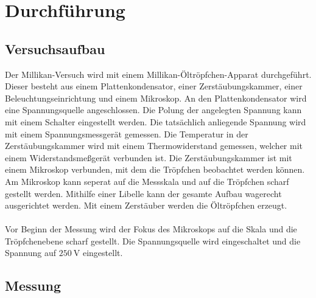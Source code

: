 \section{Durchführung}
\label{sec:Durchführung}

\subsection{Versuchsaufbau}
\label{sec:Versuchsaufbau}


Der Millikan-Versuch wird mit einem Millikan-Öltröpfchen-Apparat durchgeführt.
Dieser besteht aus einem Plattenkondensator, einer Zerstäubungskammer, einer Beleuchtungseinrichtung und einem Mikroskop.
An den Plattenkondensator wird eine Spannungsquelle angeschlossen.
Die Polung der angelegten Spannung kann mit einem Schalter eingestellt werden.
Die tatsächlich anliegende Spannung wird mit einem Spannungsmessgerät gemessen.
Die Temperatur in der Zerstäubungskammer wird mit einem Thermowiderstand gemessen,
welcher mit einem Widerstandsmeßgerät verbunden ist.
Die Zerstäubungskammer ist mit einem Mikroskop verbunden, mit dem die Tröpfchen beobachtet werden können.
Am Mikroskop kann seperat auf die Messskala und auf die Tröpfchen scharf gestellt werden.
Mithilfe einer Libelle kann der gesamte Aufbau wagerecht ausgerichtet werden.
Mit einem Zerstäuber werden die Öltröpfchen erzeugt.\\
\\
Vor Beginn der Messung wird der Fokus des Mikroskops auf die Skala und die Tröpfchenebene scharf gestellt.
Die Spannungsquelle wird eingeschaltet und die Spannung auf $\SI{250}{\volt}$ eingestellt.



\subsection{Messung}
\label{sec:Messung}


